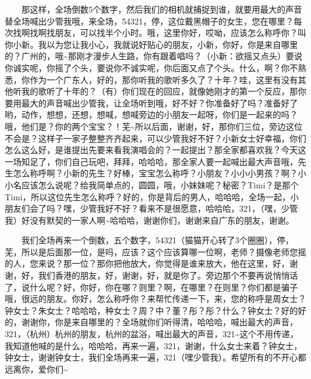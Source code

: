 \documentclass[]{ctexbook}
\begin{document}
  那这样，全场倒数5个数字，然后我们的相机就捕捉到谁，就要用最大的声音替全场喊出少管我哦，来全场，54321，停，这位戴黑帽子的女生，您在哪里？每次找啊找啊找朋友，可以找半个小时。哦，这里你好，哎呦，应该怎么称呼你？叫你小新。我以为您让我小心，我就说好贴心的朋友，小新，你好，你是来自哪里的？广州的，哦\textasciitilde 那刚才漫步人生路，你有跟着唱吗？（小新：欲摇又点头）要说你诚实呢，你摇了个头，要说你不诚实呢，你后面又点了个头。什么，啊？你不熟悉，你作为一个广东人，好的，那你听我的歌听多久了？十年？哇，这里有没有其他听我的歌听了十年的？（有）你们现在的回应，就像她刚才的第一个反应，那你要用最大的声音喊出少管我，让全场听到哦，好不好？你准备好了吗？准备好了哟，动作，想想，还想，想喊，想喊旁边的小朋友一起呀，你们是一起来的吗？哦，他们是？你的两个宝宝？！芜\textasciitilde 所以后面，谢谢，好，那你们三位，旁边这位不会是？这样子一家子整整齐齐起来，可以少管我好不好？小新女士好幸福，你们怎么这么好，是谁提出先要来看我演唱会的？一起提出？那全家都喜欢我？今天这一场知足了，你们自己玩吧，拜拜，哈哈哈，那全家人要一起喊出最大声音哦，先生怎么称呼啊？小新的先生？好棒，宝宝怎么称呼？小朋友？小小小男孩？啊？小小名应该怎么说呢？给我简单点的，圆圆，哦，小妹妹呢？秘密？Timi？是那个Timi，所以这位先生怎么称呼？好的，你是背后的男人，哈哈哈，全场一起，小朋友们会了吗？嘿，少管我好不好？看来不是很愿意，哈哈哈，321，（嘿，少管我）好没有默契的一家人啊\textasciitilde 哈哈哈，谢谢你们，谢谢来自广东的朋友，谢谢。

  我们全场再来一个倒数，五个数字，54321（猫猫开心转了3个圈圈），停，芜，所以是后面那一位，是吗，应该？这个应该算哪一位啊，老师？摄像老师您摇的人，您来说？那一位？那你把他放大，你觉得是谁来放大，他在这里，好，谢谢，好，我们香港的朋友，好，谢谢，好，就是你了。旁边那个不要再说悄悄话了，说什么呢？好，你好，你在哪？则里？啊，在哪里？在则里？你们都是骗子哦，很远的朋友。你好，怎么称呼你？来帮忙传递一下，来，您的称呼是周女士？钟女士？朱女士？哈哈哈，种女士？周？中？董？彤？彤？什么？钟女士？好的好的，谢谢你，你是来自哪里的？全场就你们听得清，哈哈哈，喊出最大的声音，321，（杭州）杭州的朋友，杭州的盆浴，喊出最大的声音，321\textasciitilde 这个不用传递，我知道他喊的是什么，哈哈哈，再来一遍，321，谢谢，什么女士来着？钟女士，钟女士，谢谢钟女士，我们全场再来一遍，321（嘿少管我）。希望所有的不开心都远离你，爱你们\textasciitilde{}
\end{document}
